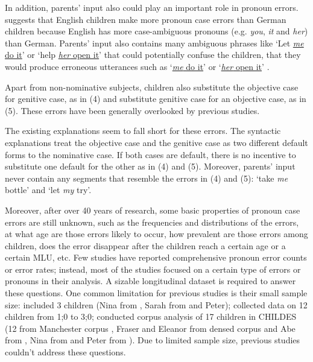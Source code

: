 In addition, parents' input also could play an important role in pronoun errors. \cite{pelham2011input} suggests that English children make more pronoun case errors than German children because English has more case-ambiguous pronouns (e.g. \textit{you}, \textit{it} and \textit{her}) than German. Parents' input also contains many ambiguous phrases like `Let \underline{\textit{me} do it}' or `help \underline{\textit{her} open it}' that could potentially confuse the children, that they would produce erroneous utterances such as `\underline{\textit{me} do it}' or `\underline{\textit{her} open it}' \citep{tomasello2000, kirjavainen2009can}.  




Apart from non-nominative subjects, children also substitute the objective case for genitive case, as in (4) and substitute genitive case for an objective case, as in (5). These errors have been generally overlooked by previous studies.
\begin{exe}
\end{exe}
The existing explanations seem to fall short for these errors. The syntactic explanations treat the objective case and the genitive case as two different default forms to the nominative case. If both cases are default, there is no incentive to substitute one default for the other as in (4) and (5). Moreover, parents' input never contain any segments that resemble the errors in (4) and (5): `take \textit{me} bottle' and `let \textit{my} try'. 

Moreover, after over 40 years of research, some basic properties of pronoun case errors are still unknown, such as the frequencies and distributions of the errors, at what age are those errors likely to occur, how prevalent are those errors among children, does the error disappear after the children reach a certain age or a certain MLU, etc. Few studies have reported comprehensive pronoun error counts or error rates; instead, most of the studies focused on a certain type of errors or pronouns in their analysis. A sizable longitudinal dataset is required to answer these questions. One common limitation for previous studies is their small sample size: \cite{schutze1996subject} included 3 children (Nina from \citep{suppes1974semantics}, Sarah from \citep{brown1973first} and Peter\citep{bloom1974imitation}); \cite{rispoli1998} collected data on 12 children from 1;0 to 3;0; \cite{kirjavainen2009can} conducted corpus analysis of 17 children in CHILDES (12 from Manchester corpus \cite{theakston2001}, Fraser and Eleanor from densed corpus \citep{rowland2006effect} and Abe from \cite{kuczaj1977acquisition}, Nina from \citep{suppes1974semantics} and Peter from \citep{bloom1974imitation}). Due to limited sample size, previous studies couldn't address these questions. 

